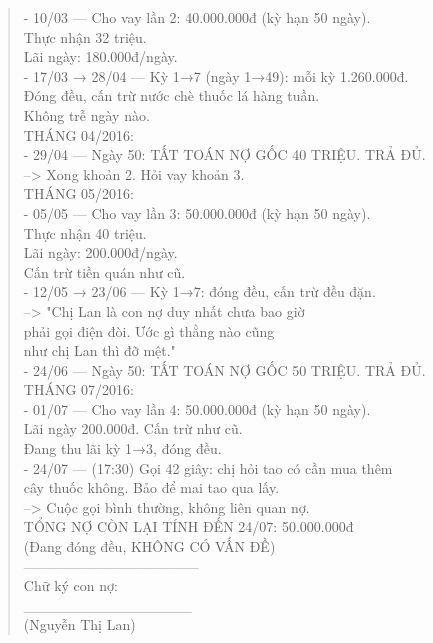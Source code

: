 \documentclass[12pt,a4paper]{article}
\begin{document}
\begin{quote}
- 10/03 --- Cho vay lần 2: 40.000.000đ (kỳ hạn 50 ngày).\\
          Thực nhận 32 triệu.\\
          Lãi ngày: 180.000đ/ngày.\\
\vspace{0.2cm}
- 17/03 → 28/04 --- Kỳ 1→7 (ngày 1→49): mỗi kỳ 1.260.000đ.\\
          Đóng đều, cấn trừ nước chè thuốc lá hàng tuần.\\
          Không trễ ngày nào.\\
\vspace{0.2cm}
THÁNG 04/2016:\\
- 29/04 --- Ngày 50: TẤT TOÁN NỢ GỐC 40 TRIỆU. TRẢ ĐỦ.\\
          --> Xong khoản 2. Hỏi vay khoản 3.\\
\vspace{0.2cm}
THÁNG 05/2016:\\
- 05/05 --- Cho vay lần 3: 50.000.000đ (kỳ hạn 50 ngày).\\
          Thực nhận 40 triệu.\\
          Lãi ngày: 200.000đ/ngày.\\
          Cấn trừ tiền quán như cũ.\\
\vspace{0.2cm}
- 12/05 → 23/06 --- Kỳ 1→7: đóng đều, cấn trừ đều đặn.\\
          --> "Chị Lan là con nợ duy nhất chưa bao giờ\\
               phải gọi điện đòi. Ước gì thằng nào cũng\\
               như chị Lan thì đỡ mệt."\\
- 24/06 --- Ngày 50: TẤT TOÁN NỢ GỐC 50 TRIỆU. TRẢ ĐỦ.\\
\vspace{0.2cm}
THÁNG 07/2016:\\
- 01/07 --- Cho vay lần 4: 50.000.000đ (kỳ hạn 50 ngày).\\
          Lãi ngày 200.000đ. Cấn trừ như cũ.\\
          Đang thu lãi kỳ 1→3, đóng đều.\\
- 24/07 --- (17:30) Gọi 42 giây: chị hỏi tao có cần mua thêm\\
          cây thuốc không. Bảo để mai tao qua lấy.\\
          --> Cuộc gọi bình thường, không liên quan nợ.\\
\vspace{0.2cm}
TỔNG NỢ CÒN LẠI TÍNH ĐẾN 24/07: 50.000.000đ\\
(Đang đóng đều, KHÔNG CÓ VẤN ĐỀ)\\
--------------------------------------\\
Chữ ký con nợ:\\
\vspace{0.2cm}
\_\_\_\_\_\_\_\_\_\_\_\_\_\_\_\_\\
(Nguyễn Thị Lan)\\
\end{quote}
\end{document}
